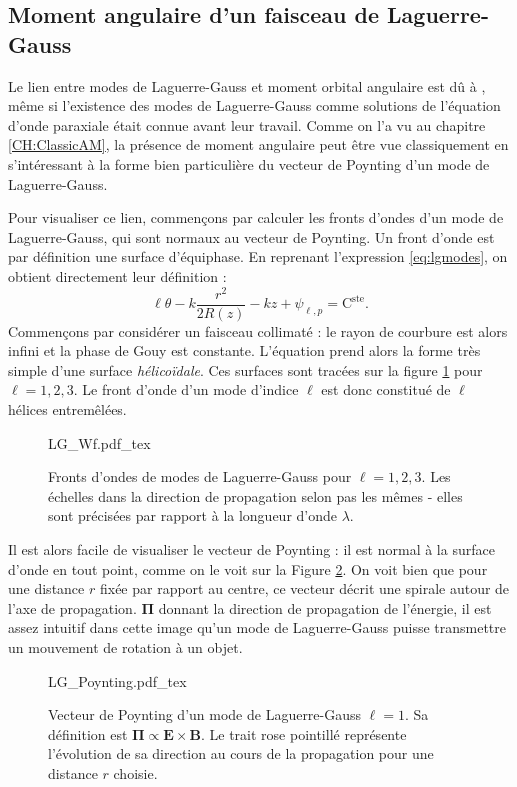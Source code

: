 \subsection{Moment angulaire d'un faisceau de Laguerre-Gauss}
Le lien entre modes de Laguerre-Gauss et moment orbital angulaire est dû à , même si l'existence des modes de Laguerre-Gauss comme solutions de l'équation d'onde paraxiale était connue avant leur travail. Comme on l'a vu au chapitre \ref{CH:ClassicAM}, la présence de moment angulaire peut être vue classiquement en s'intéressant à la forme bien particulière du vecteur de Poynting d'un mode de Laguerre-Gauss.\par
Pour visualiser ce lien, commençons par calculer les fronts d'ondes d'un mode de Laguerre-Gauss, qui sont normaux au vecteur de Poynting.
Un front d'onde est par définition une surface d'équiphase. En reprenant l'expression \ref{eq:lgmodes}, on obtient directement leur définition :
\begin{equation}
\ell\theta-k\frac{r^2}{2R(z)}-kz+\psi _{\ell ,p} = \mathrm{C}^\mathrm{ste}.
\end{equation}
Commençons par considérer un faisceau collimaté : le rayon de courbure est alors infini et la phase de Gouy est constante. L'équation prend alors la forme très simple d'une surface \textit{hélicoïdale}. Ces surfaces sont tracées sur la figure \ref{Fig:LGwf} pour $\ell = 1,2,3$. Le front d'onde d'un mode d'indice $\ell$ est donc constitué de $\ell$ hélices entremêlées.
\begin{figure}[!ht]
\centering
\def\svgwidth{\columnwidth}
{LG_Wf.pdf_tex}
\caption{Fronts d'ondes de modes de Laguerre-Gauss pour $\ell=1,2,3$. Les échelles dans la direction de propagation selon pas les mêmes - elles sont précisées par rapport à la longueur d'onde $\lambda$.}
\label{Fig:LGwf}
\end{figure}

Il est alors facile de visualiser le vecteur de Poynting : il est normal à la surface d'onde en tout point, comme on le voit sur la Figure \ref{Fig:LGPoynting}. On voit bien que pour une distance $r$ fixée par rapport au centre, ce vecteur décrit une spirale autour de l'axe de propagation. $\bm{\Pi}$ donnant la direction de propagation de l'énergie, il est assez intuitif dans cette image qu'un mode de Laguerre-Gauss puisse transmettre un mouvement de rotation à un objet.

\begin{figure}[!ht]
\centering
\def\svgwidth{0.7\columnwidth}
{LG_Poynting.pdf_tex}
\caption{Vecteur de Poynting d'un mode de Laguerre-Gauss $\ell=1$. Sa définition est $\bm{\Pi} \propto \bm{E}\times\bm{B}$. Le trait rose pointillé représente l'évolution de sa direction au cours de la propagation pour une distance $r$ choisie.}
\label{Fig:LGPoynting}
\end{figure}

